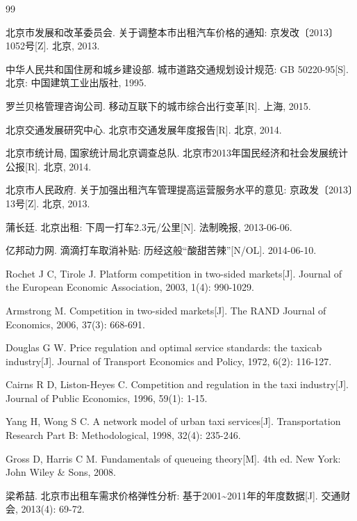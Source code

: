 \documentclass[12pt,a4paper]{ctexart}
\begin{document}
\begin{thebibliography}{99}

 北京市发展和改革委员会. 关于调整本市出租汽车价格的通知: 京发改〔2013〕1052号[Z]. 北京, 2013.

 中华人民共和国住房和城乡建设部. 城市道路交通规划设计规范: GB 50220-95[S]. 北京: 中国建筑工业出版社, 1995.

 罗兰贝格管理咨询公司. 移动互联下的城市综合出行变革[R]. 上海, 2015.

 北京交通发展研究中心. 北京市交通发展年度报告[R]. 北京, 2014.

 北京市统计局, 国家统计局北京调查总队. 北京市2013年国民经济和社会发展统计公报[R]. 北京, 2014.

 北京市人民政府. 关于加强出租汽车管理提高运营服务水平的意见: 京政发〔2013〕13号[Z]. 北京, 2013.

 蒲长廷. 北京出租: 下周一打车2.3元/公里[N]. 法制晚报, 2013-06-06.

 亿邦动力网. 滴滴打车取消补贴: 历经这般“酸甜苦辣”[N/OL]. 2014-06-10.

 Rochet J C, Tirole J. Platform competition in two-sided markets[J]. Journal of the European Economic Association, 2003, 1(4): 990-1029.

 Armstrong M. Competition in two-sided markets[J]. The RAND Journal of Economics, 2006, 37(3): 668-691.

 Douglas G W. Price regulation and optimal service standards: the taxicab industry[J]. Journal of Transport Economics and Policy, 1972, 6(2): 116-127.

 Cairns R D, Liston-Heyes C. Competition and regulation in the taxi industry[J]. Journal of Public Economics, 1996, 59(1): 1-15.

 Yang H, Wong S C. A network model of urban taxi services[J]. Transportation Research Part B: Methodological, 1998, 32(4): 235-246.

 Gross D, Harris C M. Fundamentals of queueing theory[M]. 4th ed. New York: John Wiley \& Sons, 2008.

 梁希喆. 北京市出租车需求价格弹性分析: 基于2001\textasciitilde 2011年的年度数据[J]. 交通财会, 2013(4): 69-72.

\end{thebibliography}
\end{document}
